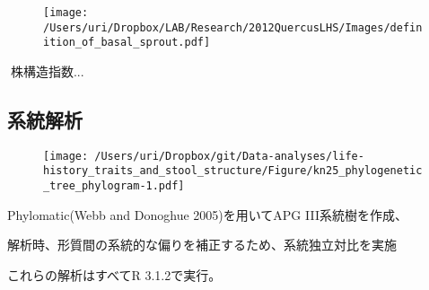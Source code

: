 \documentclass[a0, 36pt, plainboxedsections]{sciposter} %
\begin{document}
\begin{multicols}{3}
{\begin{figure}
	\centering
	\texttt{[image: /Users/uri/Dropbox/LAB/Research/2012QuercusLHS/Images/definition\_of\_basal\_sprout.pdf]}
\end{figure}


株構造指数... 

\columnbreak
\subsection*{\small{系統解析}}

\begin{wrapfigure}{r}{16em}
  \texttt{[image: /Users/uri/Dropbox/git/Data-analyses/life-history\_traits\_and\_stool\_structure/Figure/kn25\_phylogenetic\_tree\_phylogram-1.pdf]}
\end{wrapfigure}

Phylomatic(Webb and Donoghue 2005)を用いてAPG III系統樹を作成、

解析時、形質間の系統的な偏りを補正するため、系統独立対比を実施

これらの解析はすべてR 3.1.2で実行。

}\end{multicols}


\end{document}
